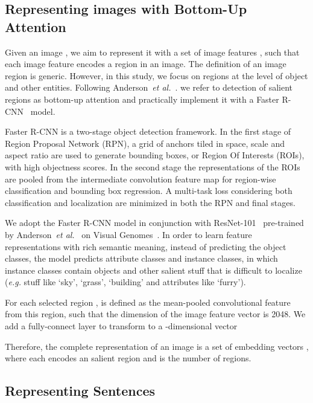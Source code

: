 \documentclass[runningheads]{llncs}
\begin{document}
\subsection{Representing images with Bottom-Up Attention}
\label{sec:image_rep}
Given an image , we aim to represent it with a set of image features , such that each image feature encodes a region in an image. The definition of an image region is generic. However, in this study, we focus on regions at the level of object and other entities. Following Anderson~\textit{et al.}~\cite{anderson2017bottom}. we refer to detection of salient regions as bottom-up attention and practically implement it with a Faster R-CNN~\cite{ren2015faster} model. 

Faster R-CNN is a two-stage object detection framework. In the first stage of Region Proposal Network (RPN), a grid of anchors tiled in space, scale and aspect ratio are used to generate bounding boxes, or Region Of Interests (ROIs), with high objectness scores. In the second stage the representations of the ROIs are pooled from the intermediate convolution feature map for region-wise classification and bounding box regression. A multi-task loss considering both classification and localization are minimized in both the RPN and final stages.

We adopt the Faster R-CNN model in conjunction with ResNet-101~\cite{he2016deep} pre-trained by Anderson~\textit{et al.}~\cite{anderson2017bottom} on Visual Genomes~\cite{krishna2017visual}. In order to learn feature representations with rich semantic meaning, instead of predicting the object classes, the model predicts attribute classes and instance classes, in which instance classes contain objects and other salient stuff that is difficult to localize ({\em e.g.} stuff like `sky', `grass', `building' and attributes like `furry'). 

For each selected region ,  is defined as the mean-pooled convolutional feature from this region, such that the dimension of the image feature vector is 2048. We add a fully-connect layer to transform  to a -dimensional vector

Therefore, the complete representation of an image is a set of embedding vectors , where each  encodes an salient region and  is the number of regions. 

\subsection{Representing Sentences}
\label{sec:text_rep}
\end{document}
